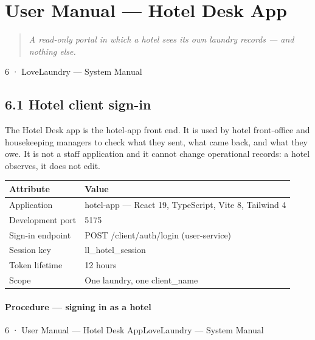 \documentclass[11pt,a4paper,oneside]{book}
\begin{document}
\chapter{User Manual — Hotel Desk App}
\begin{quote}\itshape A read-only portal in which a hotel sees its own laundry records — and nothing else.\end{quote}
6 · LoveLaundry — System Manual

\section{6.1 Hotel client sign-in}
The Hotel Desk app is the hotel-app front end. It is used by hotel front-office and housekeeping managers to check what they sent, what came back, and what they owe. It is not a staff application and it cannot change operational records: a hotel observes, it does not edit.

\begin{center}\small
\begin{tabularx}{\linewidth}{|X|X|}
\hline
\rowcolor{lightgrey}
\textbf{Attribute} & \textbf{Value} \\ \hline
Application & hotel-app — React 19, TypeScript, Vite 8, Tailwind 4 \\ \hline
Development port & 5175 \\ \hline
Sign-in endpoint & POST /client/auth/login (user-service) \\ \hline
Session key & ll\_hotel\_session \\ \hline
Token lifetime & 12 hours \\ \hline
Scope & One laundry, one client\_name \\ \hline
\end{tabularx}
\end{center}
\subsubsection*{Procedure — signing in as a hotel}
6 · User Manual — Hotel Desk AppLoveLaundry — System Manual
\end{document}
